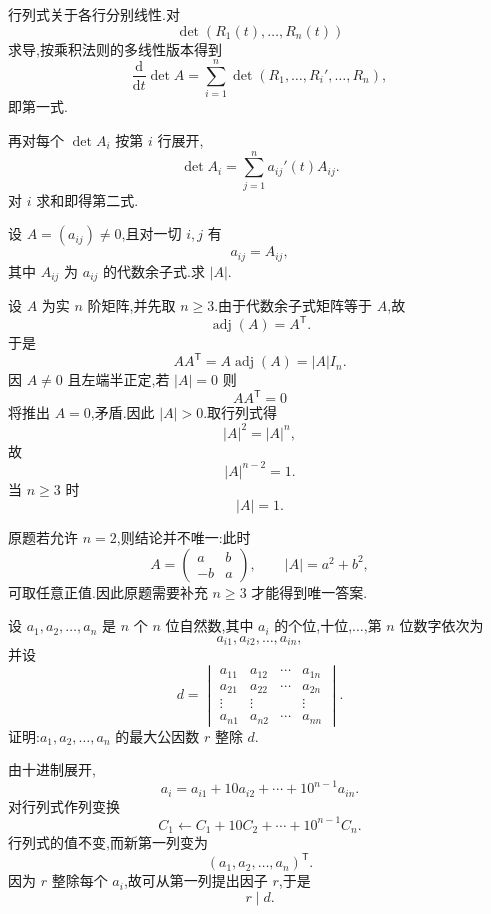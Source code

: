 \begin{solution}
行列式关于各行分别线性.对
\[
\det(R_1(t),\ldots,R_n(t))
\]
求导,按乘积法则的多线性版本得到
\[
\dfrac{\mathrm{d}}{\mathrm{d}t}\det A
=
\sum\limits_{i=1}^{n}
\det(R_1,\ldots,R_i',\ldots,R_n),
\]
即第一式.

再对每个 $\det A_i$ 按第 $i$ 行展开,
\[
\det A_i
=
\sum\limits_{j=1}^{n}a_{ij}'(t)A_{ij}.
\]
对 $i$ 求和即得第二式.
\end{solution}


\begin{example}[\markstar]
设 $A=(a_{ij})\neq0$,且对一切 $i,j$ 有
\[
a_{ij}=A_{ij},
\]
其中 $A_{ij}$ 为 $a_{ij}$ 的代数余子式.求 $|A|$.
\end{example}
\exampleblank

\begin{solution}
设 $A$ 为实 $n$ 阶矩阵,并先取 $n\geq3$.由于代数余子式矩阵等于 $A$,故
\[
\operatorname{adj}(A)=A^{\mathsf T}.
\]
于是
\[
AA^{\mathsf T}
=
A\operatorname{adj}(A)
=
|A|I_n.
\]
因 $A\neq0$ 且左端半正定,若 $|A|=0$ 则
\[
AA^{\mathsf T}=0
\]
将推出 $A=0$,矛盾.因此 $|A|>0$.取行列式得
\[
|A|^2=|A|^n,
\]
故
\[
|A|^{n-2}=1.
\]
当 $n\geq3$ 时
\[
\boxed{|A|=1}.
\]

原题若允许 $n=2$,则结论并不唯一:此时
\[
A=
\begin{pmatrix}
a&b\\
-b&a
\end{pmatrix},
\qquad
|A|=a^2+b^2,
\]
可取任意正值.因此原题需要补充 $n\geq3$ 才能得到唯一答案.
\end{solution}


\begin{example}
设 $a_1,a_2,\ldots,a_n$ 是 $n$ 个 $n$ 位自然数,其中 $a_i$ 的个位,十位,$\ldots$,第 $n$ 位数字依次为
\[
a_{i1},a_{i2},\ldots,a_{in},
\]
并设
\[
d=
\begin{vmatrix}
a_{11}&a_{12}&\cdots&a_{1n}\\
a_{21}&a_{22}&\cdots&a_{2n}\\
\vdots&\vdots&&\vdots\\
a_{n1}&a_{n2}&\cdots&a_{nn}
\end{vmatrix}.
\]
证明:$a_1,a_2,\ldots,a_n$ 的最大公因数 $r$ 整除 $d$.
\end{example}
\exampleblank

\begin{solution}
由十进制展开,
\[
a_i
=
a_{i1}+10a_{i2}+\cdots+10^{n-1}a_{in}.
\]
对行列式作列变换
\[
C_1
\longleftarrow
C_1+10C_2+\cdots+10^{n-1}C_n.
\]
行列式的值不变,而新第一列变为
\[
(a_1,a_2,\ldots,a_n)^{\mathsf T}.
\]
因为 $r$ 整除每个 $a_i$,故可从第一列提出因子 $r$,于是
\[
\boxed{r\mid d}.
\]
\end{solution}


